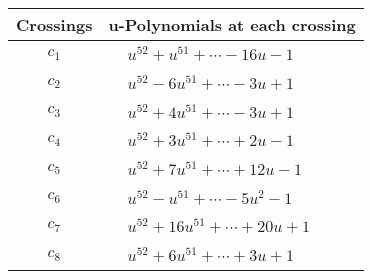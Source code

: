\documentclass[1p]{elsarticle_modified}
\theoremstyle{definition}
\begin{document}
\begin{tabular}{m{50pt}|m{274pt}}
Crossings & \hspace{64pt}u-Polynomials at each crossing \\
\hline $$\begin{aligned}c_{1}\end{aligned}$$&$\begin{aligned}
&u^{52}+u^{51}+\cdots-16 u-1
\end{aligned}$\\
\hline $$\begin{aligned}c_{2}\end{aligned}$$&$\begin{aligned}
&u^{52}-6 u^{51}+\cdots-3 u+1
\end{aligned}$\\
\hline $$\begin{aligned}c_{3}\end{aligned}$$&$\begin{aligned}
&u^{52}+4 u^{51}+\cdots-3 u+1
\end{aligned}$\\
\hline $$\begin{aligned}c_{4}\end{aligned}$$&$\begin{aligned}
&u^{52}+3 u^{51}+\cdots+2 u-1
\end{aligned}$\\
\hline $$\begin{aligned}c_{5}\end{aligned}$$&$\begin{aligned}
&u^{52}+7 u^{51}+\cdots+12 u-1
\end{aligned}$\\
\hline $$\begin{aligned}c_{6}\end{aligned}$$&$\begin{aligned}
&u^{52}- u^{51}+\cdots-5 u^2-1
\end{aligned}$\\
\hline $$\begin{aligned}c_{7}\end{aligned}$$&$\begin{aligned}
&u^{52}+16 u^{51}+\cdots+20 u+1
\end{aligned}$\\
\hline $$\begin{aligned}c_{8}\end{aligned}$$&$\begin{aligned}
&u^{52}+6 u^{51}+\cdots+3 u+1
\end{aligned}$\\

\end{tabular}
\end{document}
